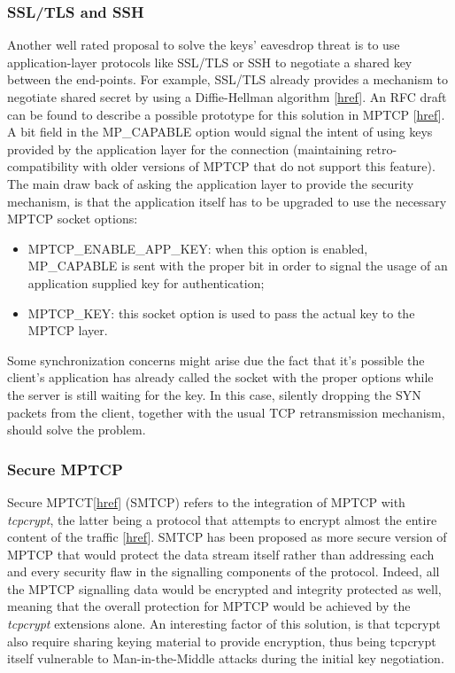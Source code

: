 \subsubsection{SSL/TLS and SSH}
Another well rated proposal to solve the keys' eavesdrop threat is to use application-layer protocols like SSL/TLS or SSH to negotiate a shared key between the end-points. For example, SSL/TLS already provides a mechanism to negotiate shared secret by using a Diffie-Hellman algorithm [\href{https://wiki.openssl.org/index.php/Diffie_Hellman#Diffie-Hellman_in_SSL.2FTLS}{href}].
  An RFC draft can be found to describe a possible prototype for this solution in MPTCP [\href{http://tools.ietf.org/html/draft-paasch-mptcp-ssl-00}{href}]. A bit field in the MP\_CAPABLE option would signal the intent of using keys provided by the application layer for the connection (maintaining retro-compatibility with older versions of MPTCP that do not support this feature).
The main draw back of asking the application layer to provide the security mechanism, is that the application itself has to be upgraded to use the necessary MPTCP socket options:

\begin{itemize}
  \item MPTCP\_ENABLE\_APP\_KEY: when this option is enabled, MP\_CAPABLE is sent with the proper bit in order to signal the usage of an application supplied key for authentication;
  \item MPTCP\_KEY: this socket option is used to pass the actual key to the MPTCP layer.
\end{itemize}

Some synchronization concerns might arise due the fact that it's possible the client's application has already called the socket with the proper options while the server is still waiting for the key. In this case, silently dropping the SYN packets from the client, together with the usual TCP retransmission mechanism, should solve the problem.

\subsubsection{Secure MPTCP}
Secure MPTCT[\href{https://tools.ietf.org/html/draft-bagnulo-mptcp-secure-00}{href}] (SMTCP) refers to the integration of MPTCP with \textit{tcpcrypt}, the latter being a protocol that attempts to encrypt almost the entire content of the traffic [\href{http://www.tcpcrypt.org/}{href}]. SMTCP has been proposed as more secure version of MPTCP that would protect the data stream itself rather than addressing each and every security flaw in the signalling components of the protocol. Indeed, all the MPTCP signalling data would be encrypted and integrity protected as well, meaning that the overall protection for MPTCP would be achieved by the \textit{tcpcrypt} extensions alone. An interesting factor of this solution, is that tcpcrypt also require sharing keying material to provide encryption, thus being tcpcrypt itself vulnerable to Man-in-the-Middle attacks during the initial key negotiation.

